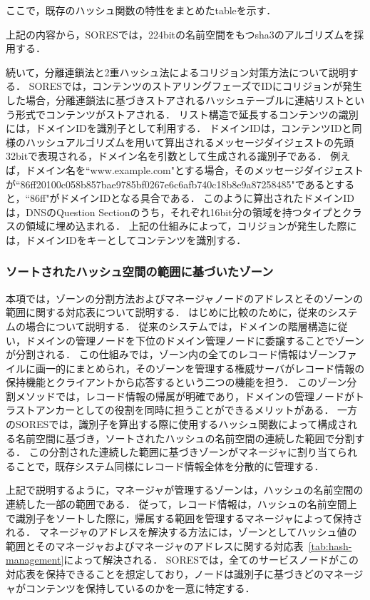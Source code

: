 ここで，既存のハッシュ関数の特性をまとめたtableを示す．

上記の内容から，SORESでは，224bitの名前空間をもつsha3のアルゴリズムを採用する．

続いて，分離連鎖法と2重ハッシュ法によるコリジョン対策方法について説明する．
SORESでは，コンテンツのストアリングフェーズでIDにコリジョンが発生した場合，分離連鎖法に基づきストアされるハッシュテーブルに連結リストという形式でコンテンツがストアされる．
リスト構造で延長するコンテンツの識別には，ドメインIDを識別子として利用する．
ドメインIDは，コンテンツIDと同様のハッシュアルゴリズムを用いて算出されるメッセージダイジェストの先頭32bitで表現される，ドメイン名を引数として生成される識別子である．
例えば，ドメイン名を``www.example.com"とする場合，そのメッセージダイジェストが``86ff20100c058b857bae9785bf0267e6c6afb740c18b8e9a87258485"であるとすると，``86ff"がドメインIDとなる具合である．
このように算出されたドメインIDは，DNSのQuestion Sectionのうち，それぞれ16bit分の領域を持つタイプとクラスの領域に埋め込まれる．
上記の仕組みによって，コリジョンが発生した際には，ドメインIDをキーとしてコンテンツを識別する．


\subsubsection{ソートされたハッシュ空間の範囲に基づいたゾーン}
本項では，ゾーンの分割方法およびマネージャノードのアドレスとそのゾーンの範囲に関する対応表について説明する．
はじめに比較のために，従来のシステムの場合について説明する．
従来のシステムでは，ドメインの階層構造に従い，ドメインの管理ノードを下位のドメイン管理ノードに委譲することでゾーンが分割される．
この仕組みでは，ゾーン内の全てのレコード情報はゾーンファイルに画一的にまとめられ，そのゾーンを管理する権威サーバがレコード情報の保持機能とクライアントから応答するという二つの機能を担う．
このゾーン分割メソッドでは，レコード情報の帰属が明確であり，ドメインの管理ノードがトラストアンカーとしての役割を同時に担うことができるメリットがある．
一方のSORESでは，識別子を算出する際に使用するハッシュ関数によって構成される名前空間に基づき，ソートされたハッシュの名前空間の連続した範囲で分割する．
この分割された連続した範囲に基づきゾーンがマネージャに割り当てられることで，既存システム同様にレコード情報全体を分散的に管理する．

上記で説明するように，マネージャが管理するゾーンは，ハッシュの名前空間の連続した一部の範囲である．
従って，レコード情報は，ハッシュの名前空間上で識別子をソートした際に，帰属する範囲を管理するマネージャによって保持される．
マネージャのアドレスを解決する方法には，ゾーンとしてハッシュ値の範囲とそのマネージャおよびマネージャのアドレスに関する対応表~\ref{tab:hash-management}によって解決される．
SORESでは，全てのサービスノードがこの対応表を保持できることを想定しており，ノードは識別子に基づきどのマネージャがコンテンツを保持しているのかを一意に特定する．


